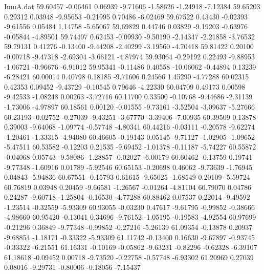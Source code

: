 \begin{filecontents}{ImuA.dat}
  59.60457   -0.06461    0.06939   -9.71606   -1.58626   -1.24918   -7.12384
  59.65203    0.29312    0.03948   -9.95653   -0.21995    0.70486   -6.02469
  59.67522    0.43430   -0.02393   -9.61556    0.05484    1.14758   -5.65067
  59.69829    0.44746    0.03829   -9.19203   -0.63976   -0.05844   -4.89501
  59.74497    0.62453   -0.09930   -9.50190   -2.14347   -2.21858   -3.76532
  59.79131    0.41276   -0.13400   -9.44208   -2.40299   -3.19560   -4.70418
  59.81422    0.20100   -0.00718   -9.47318   -2.69304   -3.66121   -4.87974
  59.93064   -0.29192    0.22493   -9.88953   -1.06721   -0.96676   -6.91012
  59.95341   -0.11486    0.40558  -10.06062   -0.44894    0.13239   -6.28421
  60.00014    0.40798    0.18185   -9.71606    0.24566    1.45290   -4.77288
  60.02315    0.42353    0.09452   -9.43729   -0.10545    0.79646   -4.22330
  60.04709    0.49173    0.00598   -9.42533   -1.08248    0.00263   -3.72716
  60.11700    0.33500   -0.10768   -9.44686   -2.31139   -1.73006   -4.97897
  60.18561    0.00120   -0.01555   -9.73161   -3.52504   -3.09637   -5.27666
  60.23193   -0.02752   -0.27039   -9.43251   -3.67770   -3.39406   -7.00935
  60.39509    0.13878    0.39003   -9.64068   -1.09774   -0.57748   -4.80341
  60.44216   -0.03111   -0.20578   -9.62274   -1.20461   -1.33315   -4.94080
  60.46605   -0.19143    0.05145   -9.71127   -1.02905   -1.09652   -5.47511
  60.53582   -0.12203    0.21535   -9.69452   -1.01378   -0.11187   -5.74227
  60.55872   -0.04068    0.05743   -9.58086   -1.28857   -0.02027   -6.00179
  60.60462   -0.13759    0.19741   -9.77348   -1.60916    0.01789   -5.92546
  60.65153   -0.20698    0.46062   -9.73639   -1.76945    0.04843   -5.94836
  60.67551   -0.15793    0.61615   -9.65025   -1.68549    0.20109   -5.59724
  60.76819    0.03948    0.20459   -9.66581   -1.26567   -0.01264   -4.81104
  60.79070    0.04786    0.24287   -9.60718   -1.25804   -0.16530   -4.77288
  60.88462    0.07537    0.22014   -9.49592   -1.23514   -0.32559   -5.93309
  60.93055   -0.03230    0.47617   -9.61795   -0.99852   -0.38666   -4.98660
  60.95420   -0.13041    0.34696   -9.76152   -1.05195   -0.19583   -4.92554
  60.97699   -0.21296    0.36849   -9.77348   -0.99852   -0.27216   -5.26139
  61.09354   -0.13878    0.20937   -9.68854   -1.18171   -0.33322   -5.93309
  61.11742   -0.13400    0.16630   -9.67897   -0.93745   -0.33322   -6.21551
  61.16331   -0.10169   -0.05862   -9.63231   -0.82296   -0.62328   -6.39107
  61.18618   -0.09452    0.00718   -9.73520   -0.22758   -0.57748   -6.93302
  61.20969    0.27039    0.08016   -9.29731   -0.80006   -0.18056   -7.15437

\end{filecontents}
